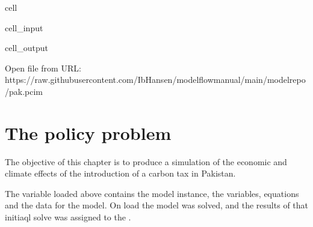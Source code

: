 \documentclass[letterpaper,10pt,english]{jupyterBook}
\begin{document}
\begin{sphinxuseclass}{cell}\begin{sphinxVerbatimInput}

\begin{sphinxuseclass}{cell_input}
\begin{sphinxVerbatim}[commandchars=\\\{\}]
  
\end{sphinxVerbatim}

\end{sphinxuseclass}\end{sphinxVerbatimInput}
\begin{sphinxVerbatimOutput}

\begin{sphinxuseclass}{cell_output}
\begin{sphinxVerbatim}[commandchars=\\\{\}]
Open file from URL:  https://raw.githubusercontent.com/IbHansen/modelflow\PYGZhy{}manual/main/model\PYGZus{}repo/pak.pcim
\end{sphinxVerbatim}

\end{sphinxuseclass}\end{sphinxVerbatimOutput}

\end{sphinxuseclass}

\section{The policy problem}
\label{\detokenize{content/05_WBModels/MoreComplexScenarios:the-policy-problem}}
\sphinxAtStartPar
The objective of this chapter is to produce a simulation of the economic and climate effects of the introduction of a carbon tax in Pakistan.

\sphinxAtStartPar
The variable  loaded above contains the model instance, the variables, equations and the data for the model.  On load the model was solved, and the results of that initiaql solve was assigned to the  .
\end{document}

